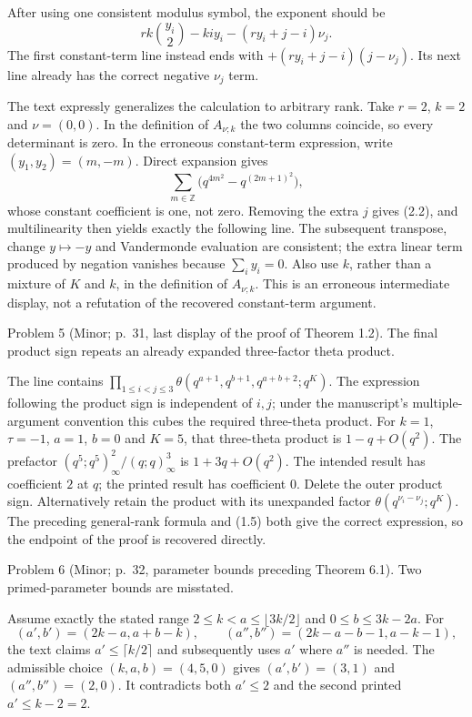 \documentclass[10pt]{article}
\begin{document}
After using one consistent modulus symbol, the exponent should be \[rk\binom{y_i}{2}-kiy_i-(ry_i+j-i)\nu_j.
 \tag{2.2}\] The first constant-term line instead ends with \(+(ry_i+j-i)(j-\nu_j)\). Its next line already has the correct negative \(\nu_j\) term.\par
The text expressly generalizes the calculation to arbitrary rank. Take \(r=2\), \(k=2\) and \(\nu=(0,0)\). In the definition of \(A_{\nu;k}\) the two columns coincide, so every determinant is zero. In the erroneous constant-term expression, write \((y_1,y_2)=(m,-m)\). Direct expansion gives \[\sum_{m\in\mathbb Z}\bigl(q^{4m^2}-q^{(2m+1)^2}\bigr),\] whose constant coefficient is one, not zero. Removing the extra \(j\) gives (2.2), and multilinearity then yields exactly the following line. The subsequent transpose, change \(y\mapsto-y\) and Vandermonde evaluation are consistent; the extra linear term produced by negation vanishes because \(\sum_i y_i=0\). Also use \(k\), rather than a mixture of \(K\) and \(k\), in the definition of \(A_{\nu;k}\). This is an erroneous intermediate display, not a refutation of the recovered constant-term argument.\par
Problem 5 (Minor; p. 31, last display of the proof of Theorem 1.2).  The final product sign repeats an already expanded three-factor theta product.\par
The line contains \(\prod_{1\le i<j\le3}\theta(q^{a+1},q^{b+1},q^{a+b+2};q^K)\). The expression following the product sign is independent of \(i,j\); under the manuscript’s multiple-argument convention this cubes the required three-theta product. For \(k=1\), \(\tau=-1\), \(a=1\), \(b=0\) and \(K=5\), that three-theta product is \(1-q+O(q^2)\). The prefactor \((q^5;q^5)_\infty^2/(q;q)_\infty^3\) is \(1+3q+O(q^2)\). The intended result has coefficient \(2\) at \(q\); the printed result has coefficient \(0\). Delete the outer product sign. Alternatively retain the product with its unexpanded factor \(\theta(q^{\nu_i-\nu_j};q^K)\). The preceding general-rank formula and (1.5) both give the correct expression, so the endpoint of the proof is recovered directly.\par
Problem 6 (Minor; p. 32, parameter bounds preceding Theorem 6.1).  Two primed-parameter bounds are misstated.\par
Assume exactly the stated range \(2\le k<a\le\lfloor3k/2\rfloor\) and \(0\le b\le3k-2a\). For \[(a',b')=(2k-a,a+b-k),\qquad
 (a'',b'')=(2k-a-b-1,a-k-1),\] the text claims \(a'\le\lceil k/2\rceil\) and subsequently uses \(a'\) where \(a''\) is needed. The admissible choice \((k,a,b)=(4,5,0)\) gives \((a',b')=(3,1)\) and \((a'',b'')=(2,0)\). It contradicts both \(a'\le2\) and the second printed \(a'\le k-2=2\).\par
\end{document}

